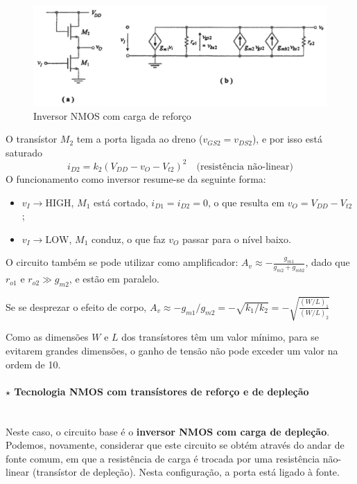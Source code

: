 \begin{figure}[H]
    \centering
    \includegraphics[width=0.6\linewidth]{img/5/inv-NMOS-carga-ref.png}
    \caption{Inversor NMOS com carga de reforço \cite{medeiros:CTBM}}
    \label{fig:inv-NMOS-carga-ref}
\end{figure}

\vspace{-0.75em}
\noindent O transístor $M_2$ tem a porta ligada ao dreno ($v_{GS2} = v_{DS2}$), e por isso está saturado
$$
     i_{D2} = k_2 (V_{DD} - v_O - V_{t2})^2 \quad \text{(resistência não-linear)}
$$
\noindent O funcionamento como inversor resume-se da seguinte forma:
\begin{itemize}[leftmargin=*, nolistsep, label=]
    \item $v_I \to \text{HIGH}$, $M_1$ está cortado, $i_{D1} = i_{D2} = 0$, o que resulta em $v_O = V_{DD} - V_{t2}$;
    \item $v_I \to \text{LOW}$, $M_1$ conduz, o que faz $v_O$ passar para o nível baixo.
\end{itemize}

\begin{mdframed}
    \noindent O circuito também se pode utilizar como amplificador: $A_v \approx -\frac{g_{m1}}{g_{m2} + g_{mb2}}$, dado que $r_{o1}$ e $r_{o2} \gg g_{m2}$, e estão em paralelo. 
    
    Se se desprezar o efeito de corpo, $A_v \approx -g_{m1}/g_{m2} = -\sqrt{k_1/k_2} = -\sqrt{\frac{(W/L)_1}{(W/L)_2}}$

    \vspace{0.5em}
    \noindent Como as dimensões $W$ e $L$ dos transístores têm um valor mínimo, para se evitarem grandes dimensões, o ganho de tensão não pode exceder um valor na ordem de 10.
\end{mdframed}

\paragraph[5.1.1.2 Tecnologia NMOS com transístores de reforço e de depleção]{$\pmb{\star}$ Tecnologia NMOS com transístores de reforço e de depleção}\mbox{}\\[4pt]
Neste caso, o circuito base é o \textbf{inversor NMOS com carga de depleção}. Podemos, novamente, considerar que este circuito se obtém através do andar de fonte comum, em que a resistência de carga é trocada por uma resistência não-linear (transístor de depleção). Nesta configuração, a porta está ligado à fonte.


